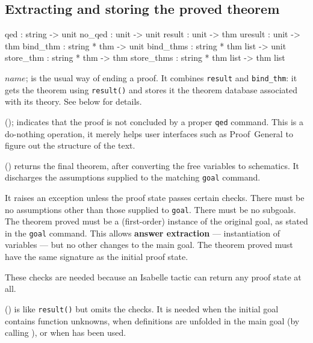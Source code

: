 \subsection{Extracting and storing the proved theorem}
\label{ExtractingAndStoringTheProvedTheorem}
\begin{ttbox} 
qed        : string -> unit
no_qed     : unit -> unit
result     : unit -> thm
uresult    : unit -> thm
bind_thm   : string * thm -> unit
bind_thms  : string * thm list -> unit
store_thm  : string * thm -> thm
store_thms : string * thm list -> thm list
\end{ttbox}
\begin{ttdescription}
\item[\ttindexbold{qed} $name$;] is the usual way of ending a proof.
  It combines \texttt{result} and \texttt{bind_thm}: it gets the theorem
  using \texttt{result()} and stores it the theorem database associated
  with its theory.  See below for details.
  
\item[\ttindexbold{no_qed}();] indicates that the proof is not concluded by a
  proper \texttt{qed} command.  This is a do-nothing operation, it merely
  helps user interfaces such as Proof~General \cite{proofgeneral} to figure
  out the structure of the {\ML} text.

\item[\ttindexbold{result}()]
  returns the final theorem, after converting the free variables to
  schematics.  It discharges the assumptions supplied to the matching 
  \texttt{goal} command.  

  It raises an exception unless the proof state passes certain checks.  There
  must be no assumptions other than those supplied to \texttt{goal}.  There
  must be no subgoals.  The theorem proved must be a (first-order) instance
  of the original goal, as stated in the \texttt{goal} command.  This allows
  {\bf answer extraction} --- instantiation of variables --- but no other
  changes to the main goal.  The theorem proved must have the same signature
  as the initial proof state.

  These checks are needed because an Isabelle tactic can return any proof
  state at all.

\item[\ttindexbold{uresult}()] is like \texttt{result()} but omits the checks.
  It is needed when the initial goal contains function unknowns, when
  definitions are unfolded in the main goal (by calling
  ), or when
   has been used.
  

\end{ttdescription}
